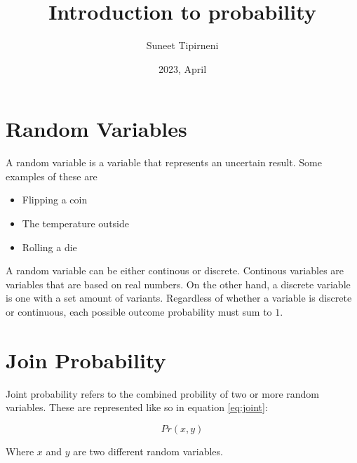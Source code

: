 \documentclass{article}
\title{Introduction to probability}
\date{2023, April}
\author{Suneet Tipirneni}
\begin{document}
\maketitle

\section{Random Variables}

A random variable is a variable that represents an uncertain result. Some examples of these are \par

\begin{itemize}
	\item Flipping a coin
	\item The temperature outside
	\item Rolling a die
\end{itemize}

A random variable can be either continous or discrete. Continous variables are variables that are based on real numbers. On the other hand, a discrete variable is one with a set amount of variants. Regardless of whether a variable is discrete or continuous, each possible outcome probability must sum to $1$.

\section{Join Probability}

Joint probability refers to the combined probility of two or more random variables. These are represented like so in equation \ref{eq:joint}:

\begin{equation} \label{eq:joint}
	Pr\left( x,y \right) 
\end{equation}

Where $x$ and $y$ are two different random variables.
\end{document}
